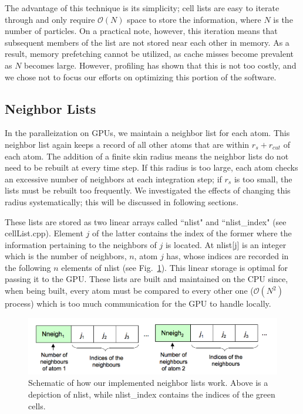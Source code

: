\documentclass[12pt]{article}
\begin{document}
The advantage of this technique is its simplicity; cell lists are easy to iterate through and only require $\mathcal{O}(N)$ space to store the information, where $N$ is the number of particles.  On a practical note, however, this iteration means that subsequent members of the list are not stored near each other in memory.  As a result, memory prefetching cannot be utilized, as cache misses become prevalent as $N$ becomes large.  However, profiling has shown that this is not too costly, and we chose not to focus our efforts on optimizing this portion of the software.

\subsection{Neighbor Lists}
In the paralleization on GPUs, we maintain a neighbor list for each atom.  This neighbor list again keeps a record of all other atoms that are within $r_s + r_{cut}$ of each atom.  The addition of a finite skin radius means the neighbor lists do not need to be rebuilt at every time step. If this radius is too large, each atom checks an excessive number of neighbors at each integration step; if $r_s$ is too small, the lists must be rebuilt too frequently.  We investigated the effects of changing this radius systematically; this will be discussed in following sections.

These lists are stored as two linear arrays called ``nlist" and ``nlist\_index" (see cellList.cpp).  Element $j$ of the latter contains the index of the former where the information pertaining to the neighbors of $j$ is located.  At nlist[j] is an integer which is the number of neighbors, $n$, atom $j$ has, whose indices are recorded in the following $n$ elements of nlist (see Fig.~\ref{fig:nlist}).  This linear storage is optimal for passing it to the GPU.  These lists are built and maintained on the CPU since, when being built, every atom must be compared to every other one ($\mathcal{O}(N^2)$ process) which is too much communication for the GPU to handle locally.

\begin{figure}[H]
   	\includegraphics[width=\textwidth]{nlist.png}
	\caption{Schematic of how our implemented neighbor lists work.  Above is a depiction of nlist, while nlist\_index contains the indices of the green cells.}
	\label{fig:nlist}
\end{figure}
\end{document}
